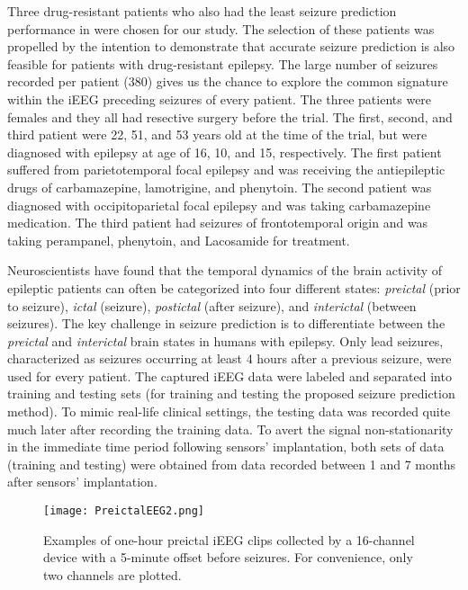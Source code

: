 \documentclass[journal]{IEEEtran}
\begin{document}
Three drug-resistant patients who also had the least seizure prediction performance in \cite{cook2013prediction} were chosen for our study. The selection of these patients was propelled by the intention to demonstrate that accurate seizure prediction is also feasible for patients with drug-resistant epilepsy. The large number of seizures recorded per patient (380) gives us the chance to explore the common signature within the iEEG preceding seizures of every patient. The three patients were females and they all had resective surgery before the trial. The first, second, and third patient were 22, 51, and 53 years old at the time of the trial, but were diagnosed with epilepsy at age of 16, 10, and 15, respectively. The first patient suffered from parietotemporal focal epilepsy and was receiving the antiepileptic drugs of carbamazepine, lamotrigine, and phenytoin. The second patient was diagnosed with occipitoparietal focal epilepsy and was taking carbamazepine medication. The third patient had seizures of frontotemporal origin and was taking perampanel, phenytoin, and Lacosamide for treatment.



Neuroscientists have found that the temporal dynamics of the brain activity of epileptic patients can often be categorized into four different states: \textit{preictal} (prior to seizure), \textit{ictal} (seizure), \textit{postictal} (after seizure), and \textit{interictal} (between seizures). The key challenge in seizure prediction is to differentiate between the \textit{preictal} and \textit{interictal} brain states in humans with epilepsy. Only lead seizures, characterized as seizures occurring at least 4 hours after a previous seizure, were used for every patient. The captured iEEG data were labeled and separated into training and testing sets (for training and testing the proposed seizure prediction method). To mimic real-life clinical settings, the testing data was recorded quite much later after recording the training data. To avert the signal non-stationarity in the immediate time period following sensors' implantation, both sets of data (training and testing) were obtained from data recorded between 1 and 7 months after sensors' implantation.

\begin{figure}[!t]\centering
	\texttt{[image: PreictalEEG2.png]}
	\caption{Examples of one-hour preictal iEEG clips collected by a 16-channel device with a 5-minute offset before seizures. For convenience, only two channels are plotted.}
	\label{Fig_PreictalEEG}
\end{figure}
\end{document}
